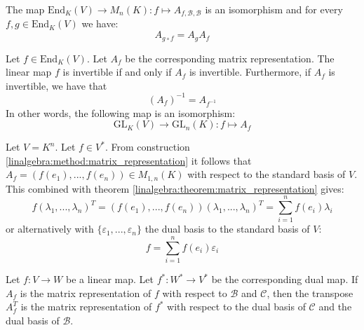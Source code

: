 	\begin{theorem}\label{linalgebra:theorem:matrix_composition_end}
	        The map $\text{End}_K(V)\rightarrow M_n(K):f\mapsto A_{f, \mathcal{B}, \mathcal{B}}$ is an isomorphism and for every $f,g\in\text{End}_K(V)$ we have:
        	\begin{equation}
			A_{g\circ f} = A_gA_f
		\end{equation}
	\end{theorem}
	
        \begin{theorem}\label{linalgebra:matrix_invertable_map}
	        Let $f\in\text{End}_K(V)$. Let $A_f$ be the corresponding matrix representation. The linear map $f$ is invertible if and only if $A_f$ is invertible. Furthermore, if $A_f$ is invertible, we have that \[\left(A_f\right)^{-1} = A_{f^{-1}}\] In other words, the following map is an isomorphism\footnotemark:
	        \begin{equation}
	        	\text{GL}_K(V)\rightarrow\text{GL}_n(K):f\mapsto A_f
	        \end{equation}
	\end{theorem}
        
        \begin{theorem}
		Let $V = K^n$. Let $f\in V^*$. From construction \ref{linalgebra:method:matrix_representation} it follows that $A_f = (f(e_1), ..., f(e_n))\in M_{1,n}(K)$ with respect to the standard basis of $V$. This combined with theorem \ref{linalgebra:theorem:matrix_representation} gives:
	        \begin{equation}
			f(\lambda_1, ..., \lambda_n)^T = (f(e_1), ..., f(e_n))(\lambda_1, ..., \lambda_n)^T = \sum_{i=1}^nf(e_i)\lambda_i
		\end{equation}
        	or alternatively with $\{\varepsilon_1, ..., \varepsilon_n\}$ the dual basis to the standard basis of $V$:
	        \begin{equation}
        	    	\label{linalgebra:map_in_function_of_dual_basis}
			\boxed{f = \sum_{i=1}^nf(e_i)\varepsilon_i}
		\end{equation}
	\end{theorem}
        
        \begin{theorem}
		Let $f:V\rightarrow W$ be a linear map. Let $f^*:W^*\rightarrow V^*$ be the corresponding dual map. If $A_f$ is the matrix representation of $f$ with respect to $\mathcal{B}$ and $\mathcal{C}$, then the transpose $A_f^T$ is the matrix representation of $f^*$ with respect to the dual basis of $\mathcal{C}$ and the dual basis of $\mathcal{B}$.
	\end{theorem}
        
